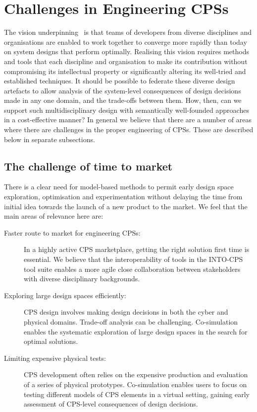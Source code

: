 \section{Challenges in Engineering CPSs}\label{sec:challenges}


The vision underpinning \into\ is that teams of developers from diverse disciplines and organisations are enabled to work together to converge more rapidly than today on system designs that perform optimally. Realising this vision requires methods and tools that each discipline and organisation to make its contribution without compromising its intellectual property or significantly altering its well-tried and established techniques. It should be possible to federate these diverse design artefacts to allow analysis of the system-level consequences of design decisions made in any one domain, and the trade-offs between them. How, then, can we support such multidisciplinary design with semantically well-founded approaches in a cost-effective manner? In general we believe that there are a number of areas where there are challenges in the proper engineering of CPSs. These are described below in separate subsections.

\subsection{The challenge of time to market}

There is a clear need for model-based methods to permit early design space exploration, optimisation and experimentation without delaying the time from initial idea towards the launch of a new product to the market. We feel that the main areas of relevance here are:

\begin{description}
\item[Faster route to market for engineering CPSs:] In a highly active CPS marketplace, getting the right solution first time is essential. We believe that the interoperability of tools in the INTO-CPS tool suite enables a more agile close collaboration between stakeholders with diverse disciplinary backgrounds.
\item[Exploring large design spaces efficiently:] CPS design involves making design decisions in both the cyber and physical domains. Trade-off analysis can be challenging. Co-simulation enables the systematic exploration of large design spaces in the search for optimal solutions.
\item[Limiting expensive physical tests:] CPS development often relies on the expensive production and evaluation of a series of physical prototypes. Co-simulation enables users to focus on testing different models of CPS elements in a virtual setting, gaining early assessment of CPS-level consequences of design decisions.
\end{description}

